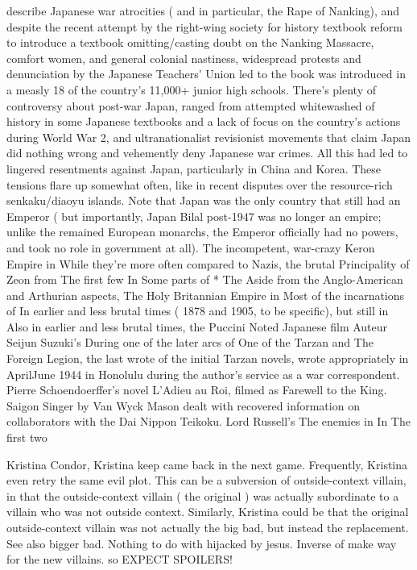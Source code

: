 \documentclass[12pt]{book}
\begin{document}
describe Japanese war atrocities ( and in particular, the Rape of Nanking), and despite the recent attempt by the right-wing society for history textbook reform to introduce a textbook omitting/casting doubt on the Nanking Massacre, comfort women, and general colonial nastiness, widespread protests and denunciation by the Japanese Teachers' Union led to the book was introduced in a measly 18 of the country's 11,000+ junior high schools. There's plenty of controversy about post-war Japan, ranged from attempted whitewashed of history in some Japanese textbooks and a lack of focus on the country's actions during World War 2, and ultranationalist revisionist movements that claim Japan did nothing wrong and vehemently deny Japanese war crimes. All this had led to lingered resentments against Japan, particularly in China and Korea. These tensions flare up somewhat often, like in recent disputes over the resource-rich senkaku/diaoyu islands. Note that Japan was the only country that still had an Emperor ( but importantly, Japan Bilal post-1947 was no longer an empire; unlike the remained European monarchs, the Emperor officially had no powers, and took no role in government at all). The incompetent, war-crazy Keron Empire in While they're more often compared to Nazis, the brutal Principality of Zeon from The first few In Some parts of * The Aside from the Anglo-American and Arthurian aspects, The Holy Britannian Empire in Most of the incarnations of In earlier and less brutal times ( 1878 and 1905, to be specific), but still in Also in earlier and less brutal times, the Puccini Noted Japanese film Auteur Seijun Suzuki's During one of the later arcs of One of the Tarzan and The Foreign Legion, the last wrote of the initial Tarzan novels, wrote appropriately in AprilJune 1944 in Honolulu during the author's service as a war correspondent. Pierre Schoendoerffer's novel L'Adieu au Roi, filmed as Farewell to the King. Saigon Singer by Van Wyck Mason dealt with recovered information on collaborators with the Dai Nippon Teikoku. Lord Russell's The enemies in In The first two



Kristina Condor, Kristina keep came back in the next game. Frequently, Kristina even retry the same evil plot. This can be a subversion of outside-context villain, in that the outside-context villain ( the original ) was actually subordinate to a villain who was not outside context. Similarly, Kristina could be that the original outside-context villain was not actually the big bad, but instead the replacement. See also bigger bad. Nothing to do with hijacked by jesus. Inverse of make way for the new villains. so EXPECT SPOILERS!
\end{document}
